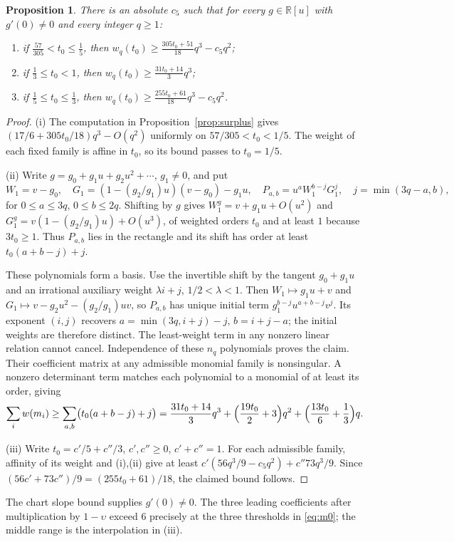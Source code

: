 \documentclass[11pt,reqno]{amsart}
\newtheorem{proposition}[theorem]{Proposition}
\theoremstyle{definition}
\theoremstyle{remark}
\numberwithin{equation}{section}
\newcommand{\R}{\mathbb R}\newcommand{\Z}{\mathbb Z}\newcommand{\N}{\mathbb N}
\begin{document}
\begin{proposition}\label{prop:A2weights}
There is an absolute $c_5$ such that for every $g\in\R[u]$ with
$g'(0)\ne0$ and every integer $q\ge1$:
\begin{enumerate}[label=\textup{(\roman*)}]
\item if $\frac{57}{305}<t_0\le\frac15$, then
$w_q(t_0)\ge\frac{305t_0+51}{18}q^3-c_5q^2$;
\item if $\frac13\le t_0<1$, then
$w_q(t_0)\ge\frac{31t_0+14}{3}q^3$;
\item if $\frac15\le t_0\le\frac13$, then
$w_q(t_0)\ge\frac{255t_0+61}{18}q^3-c_5q^2$.
\end{enumerate}
\end{proposition}
\begin{proof}
(i) The computation in Proposition~\ref{prop:surplus} gives
$(17/6+305t_0/18)q^3-O(q^2)$ uniformly on
$57/305<t_0<1/5$. The weight of each fixed family is affine in
$t_0$, so its bound passes to $t_0=1/5$.

(ii) Write $g=g_0+g_1u+g_2u^2+\cdots$, $g_1\ne0$, and put
\[
 W_1=v-g_0,\quad G_1=(1-(g_2/g_1)u)(v-g_0)-g_1u,\quad
 P_{a,b}=u^aW_1^{b-j}G_1^j,\quad j=\min(3q-a,b),
\]
for $0\le a\le3q$, $0\le b\le2q$. Shifting by $g$ gives
$W_1^g=v+g_1u+O(u^2)$ and
$G_1^g=v(1-(g_2/g_1)u)+O(u^3)$, of weighted orders $t_0$ and
at least $1$ because $3t_0\ge1$. Thus $P_{a,b}$ lies in the
rectangle and its shift has order at least $t_0(a+b-j)+j$.

These polynomials form a basis. Use the invertible shift by the tangent
$g_0+g_1u$ and an irrational auxiliary weight $\lambda i+j$,
$1/2<\lambda<1$. Then $W_1\mapsto g_1u+v$ and
$G_1\mapsto v-g_2u^2-(g_2/g_1)uv$, so $P_{a,b}$ has unique initial
term $g_1^{b-j}u^{a+b-j}v^j$. Its exponent $(i,j)$ recovers
$a=\min(3q,i+j)-j$, $b=i+j-a$; the initial weights are therefore
distinct. The least-weight term in any nonzero linear relation
cannot cancel. Independence of these $n_q$ polynomials proves the claim.
Their coefficient matrix at any admissible monomial family is
nonsingular. A nonzero determinant term matches each polynomial
to a monomial of at least its order, giving
\[
 \sum_iw(m_i)\ge\sum_{a,b}\bigl(t_0(a+b-j)+j\bigr)
 =\frac{31t_0+14}{3}q^3+\Bigl(\frac{19t_0}{2}+3\Bigr)q^2
 +\Bigl(\frac{13t_0}{6}+\frac13\Bigr)q.
\]

(iii) Write $t_0=c'/5+c''/3$, $c',c''\ge0$, $c'+c''=1$.
For each admissible family, affinity of its weight and (i),(ii) give
at least $c'(56q^3/9-c_5q^2)+c''73q^3/9$.
Since $(56c'+73c'')/9=(255t_0+61)/18$, the claimed bound follows.
\end{proof}
The chart slope bound supplies $g'(0)\ne0$. The three leading
coefficients after multiplication by $1-\upsilon$ exceed $6$
precisely at the three thresholds in \eqref{eq:m0}; the middle
range is the interpolation in (iii).
\end{document}

